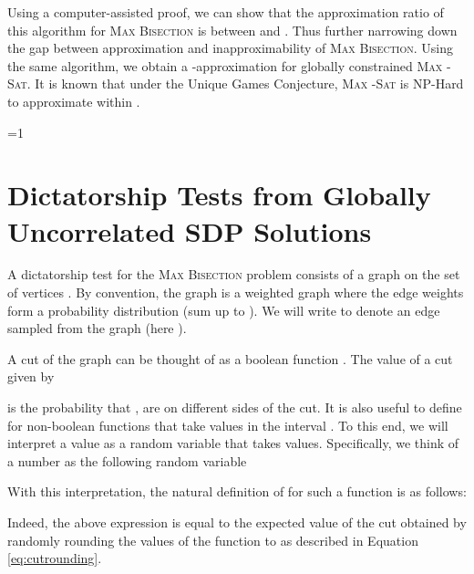 \documentclass[11pt]{article}
\def\full{1}
\newtheorem{theorem}{Theorem}[section]
\theoremstyle{definition}
\newcommand{\problemmacro}[1]{\texorpdfstring{\textsc{#1}}{#1}\xspace}
\newcommand{\maxtwosat}{\problemmacro{Max -Sat}}
\newcommand{\maxbisection}{\problemmacro{Max Bisection}}
\numberwithin{equation}{section}
\begin{document}
\iffalse
\begin{theorem}
Given a graph  admits a bisection (with respect to weight vector ) with value  and , there exists a randomized algorithm that finds a cut  satisfying:
\begin{enumerate}
\item

\item
The size of the cut is at least 
\end{enumerate}
The algorithm is based on rounding a  Lasserre's SDP hierarchy.
\end{theorem}
\fi

Using a computer-assisted proof, we can show that the approximation
ratio of this algorithm for \maxbisection is between  and .
Thus further narrowing down the gap between approximation and inapproximability of \maxbisection.
Using the same algorithm, we obtain a -approximation for globally constrained \maxtwosat. It is known that under the Unique Games Conjecture, \maxtwosat is NP-Hard to approximate within .


\ifnum\full=1

\section{Dictatorship Tests from Globally Uncorrelated SDP Solutions}

\label{sec:gaptodict}

A dictatorship test  for the \maxbisection problem
	consists of a graph on the set of vertices
	.  By convention, the graph 
	is a weighted graph where the edge weights form a
	probability distribution (sum up to ).  We will
	write  to denote an edge
	sampled from the graph  (here ).

A cut of the  graph can be thought of as a boolean function
	.  The value	of a cut  given by
		
	is the probability that , are on
different sides of the cut.
		It is also useful to define  for non-boolean
	functions  that take values
	in the interval .  To this end, we will interpret a
	value  as a random variable that
	takes  values.  Specifically, we think of a number  as the following random variable
	
	With this interpretation, the natural definition of
	 for such a function is as follows:
	
	Indeed, the above expression is equal to the expected value of the
	cut obtained by randomly rounding the values of the function
	 to  as
	described in Equation \eqref{eq:cutrounding}.
\end{document}

